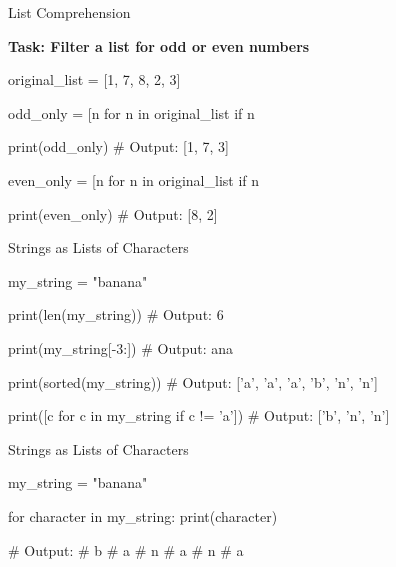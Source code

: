 \begin{frame}[fragile]{List Comprehension}

    \textbf{Task: Filter a list for odd or even numbers}

    \begin{pythoncode}

original_list = [1, 7, 8, 2, 3]

odd_only = [n for n in original_list if n %

print(odd_only)
# Output: [1, 7, 3]

even_only = [n for n in original_list if n %

print(even_only)
# Output: [8, 2]

    \end{pythoncode}



\end{frame}

\begin{frame}[fragile]{Strings as Lists of Characters}

    \begin{pythoncode}

my_string = "banana"

print(len(my_string))
# Output: 6

print(my_string[-3:])
# Output: ana

print(sorted(my_string))
# Output: ['a', 'a', 'a', 'b', 'n', 'n']

print([c for c in my_string if c != 'a'])
# Output: ['b', 'n', 'n']

    \end{pythoncode}

    

\end{frame}

\begin{frame}[fragile]{Strings as Lists of Characters}

    \begin{pythoncode}

my_string = "banana"

for character in my_string:
    print(character)

# Output:
# b
# a
# n
# a
# n
# a

    \end{pythoncode}
    

\end{frame}

